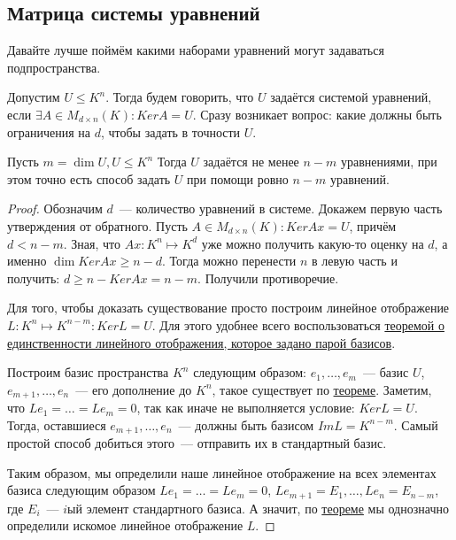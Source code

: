 \subsection{Матрица системы уравнений}
\begin{motivation}
    Давайте лучше поймём какими наборами уравнений могут задаваться подпространства.
\end{motivation}
\begin{definition}
    Допустим $U\leq K^n$. Тогда будем говорить, что $U$ задаётся системой уравнений, если
    $\exists A \in M_{d\times n}(K)\colon Ker A = U$.
    Сразу возникает вопрос: какие должны быть ограничения на $d$, чтобы задать в точности $U$.
\end{definition}
\begin{statement}
    Пусть $m = \dim U, U\leq K^n$ Тогда $U$ задаётся не менее $n - m$ уравнениями, при этом
    точно есть способ задать $U$ при помощи ровно $n - m$ уравнений.
\end{statement}
\begin{proof}
    Обозначим $d$~--- количество уравнений в системе. Докажем первую часть утверждения от обратного. 
    Пусть $A\in M_{d\times n}(K)\colon Ker Ax = U$, причём $d < n - m$.
    Зная, что $Ax\colon K^n\mapsto K^d$ уже можно получить какую-то оценку на $d$, 
    а именно $\dim Ker Ax \geq n - d$. Тогда можно перенести $n$ в левую часть и получить:
    $d \geq n - Ker Ax =  n - m$. Получили противоречие.

    Для того, чтобы доказать существование просто построим линейное отображение $L: K^n\mapsto K^{n-m}\colon
    Ker L = U$. Для этого удобнее всего воспользоваться 
    \hyperref[thm:Линейное отображение однозначно задаётся двумя базисами]{теоремой о единственности линейного
    отображения, которое задано парой базисов}.

    Построим базис пространства $K^n$ следующим образом:  $e_1,\dots,e_m$~--- базис $U$,
    $e_{m + 1},\dots, e_n$~--- его дополнение до $K^n$, такое существует по \hyperref[thm:О дополнении до базиса]{теореме}.
    Заметим, что $Le_1 = \dots = Le_m = 0$, так как иначе не выполняется условие: $Ker L = U$. 
    Тогда, оставшиеся $e_{m + 1},\dots, e_n$~--- должны быть базисом $Im L = K^{n - m}$.
    Самый простой способ добиться этого~--- отправить их в стандартный базис.
    
    Таким образом, мы определили наше линейное отображение на всех элементах базиса
    следующим образом $Le_1 = \dots = Le_m = 0$, $Le_{m + 1} = E_1, \dots, Le_n = E_{n - m}$,
    где $E_i$~--- $i$ый элемент стандартного базиса. А значит, по 
    \hyperref[thm:Линейное отображение однозначно задаётся двумя базисами]{теореме}
    мы однозначно определили искомое линейное отображение $L$.
\end{proof}
